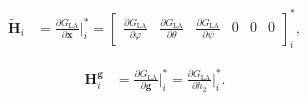\documentclass[lineno, pdflatex,sn-mathphys-ay]{sn-jnl}
\theoremstyle{thmstyleone}%
\theoremstyle{thmstyletwo}%
\theoremstyle{thmstylethree}%
\renewcommand{\vec}[1]{\boldsymbol{#1}}
\begin{document}
	
\begin{align}	\label{eq:dGdstate}
	\tilde{\vec{H}}_i
	&= \frac{\partial {G}_{\mathrm{LA}}}{\partial \vec{x}} \bigg|^*_i= %
		\begin{bmatrix}
				\frac{\partial {G}_{\mathrm{LA}}}{\partial \varphi} &
				\frac{\partial {G}_{\mathrm{LA}}}{\partial \theta} &
				\frac{\partial {G}_{\mathrm{LA}}}{\partial \psi}&
				0 &0  &0
		\end{bmatrix}_i^*,
\end{align}

	
\begin{align}   \label{eq:dGpar}
		\vec{H}^{\vec{g}}_i & = \frac{\partial {G}_{\mathrm{LA}}}{\partial \vec{g}} \bigg|^*_i=
		\frac{\partial {G}_{\mathrm{LA}}}{\partial h_2} \bigg|^*_i.
\end{align}


	
	
\end{document}
